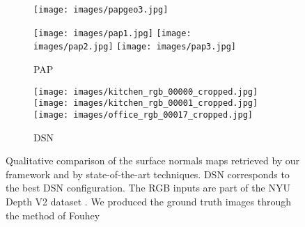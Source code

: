 \documentclass[5p]{elsarticle}
\begin{document}
\begin{figure*}[t!]
\begin{subfigure}[t]{0.13\textwidth}
         \hspace{1em}
         \texttt{[image: images/papgeo3.jpg]}
         \label{subfig3:geonet}
     \end{subfigure}
         \begin{subfigure}[t]{0.13\textwidth}
         \centering
         \caption{PAP \cite{zhang2019pattern}}
         \texttt{[image: images/pap1.jpg]}
         \hspace{1em}
         \texttt{[image: images/pap2.jpg]}
         \hspace{1em}
         \texttt{[image: images/pap3.jpg]}
         \label{subfig3:geonet}
     \end{subfigure}
          \begin{subfigure}[t]{0.13\textwidth}
         \centering
         \caption{DSN}
         \texttt{[image: images/kitchen\_rgb\_00000\_cropped.jpg]}
         \hspace{1em}
         \texttt{[image: images/kitchen\_rgb\_00001\_cropped.jpg]}
         \hspace{1em}
         \texttt{[image: images/office\_rgb\_00017\_cropped.jpg]}
         \label{subfig3:dsn}
     \end{subfigure}
     \caption{Qualitative comparison of the surface normals maps retrieved by our framework and by state-of-the-art techniques. DSN corresponds to the best DSN configuration. The RGB inputs are part of the NYU Depth V2 dataset \cite{silberman2012indoor}. We produced the ground truth images through the method of Fouhey \etal\cite{fouhey2013data}}
     \label{subfig3NYU:all}
\end{figure*}
\end{document}
